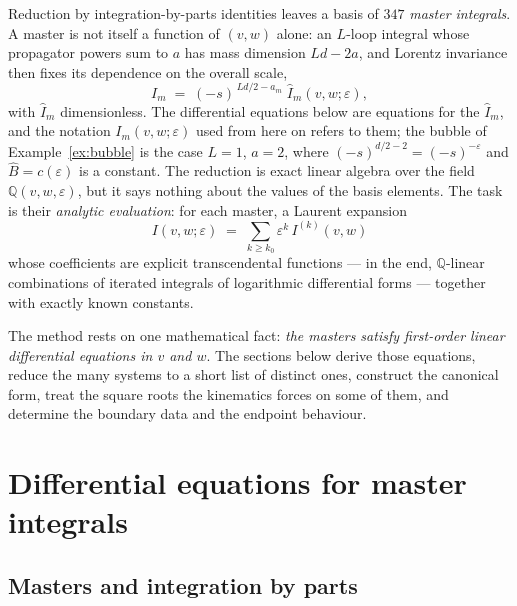 \documentclass[11pt]{article}
\newcommand{\eps}{\varepsilon}
\newcommand{\Q}{\mathbb{Q}}
\begin{document}
Reduction by integration-by-parts identities leaves a basis of $347$
\emph{master integrals}.  A master is not itself a function of
$(v,w)$ alone: an $L$-loop integral whose propagator powers sum to
$a$ has mass dimension $Ld - 2a$, and Lorentz invariance then fixes
its dependence on the overall scale,
\begin{equation}
  I_m \;=\; (-s)^{\,Ld/2 - a_m}\;\hat I_m(v,w;\eps) ,
  \label{eq:dimensionless}
\end{equation}
with $\hat I_m$ dimensionless.  The differential equations below are
equations for the $\hat I_m$, and the notation $I_m(v,w;\eps)$ used
from here on refers to them; the bubble of
Example~\ref{ex:bubble} is the case $L=1$, $a=2$, where
$(-s)^{d/2-2} = (-s)^{-\eps}$ and $\hat B = c(\eps)$ is a constant.
The reduction is exact linear algebra over the field
$\Q(v,w,\eps)$, but it says nothing about the values of the basis
elements.  The task is their \emph{analytic evaluation}: for each
master, a Laurent expansion
\begin{equation}
  I(v,w;\eps) \;=\; \sum_{k \ge k_0} \eps^{k}\, I^{(k)}(v,w)
\end{equation}
whose coefficients are explicit transcendental functions --- in the
end, $\Q$-linear combinations of iterated integrals of logarithmic
differential forms --- together with exactly known constants.

The method rests on one mathematical fact: \emph{the masters satisfy
first-order linear differential equations in $v$ and $w$}.  The
sections below derive those equations, reduce the many systems to a
short list of distinct ones, construct the canonical form, treat the
square roots the kinematics forces on some of them, and determine the
boundary data and the endpoint behaviour.

\section{Differential equations for master integrals}
\label{sec:de}

\subsection{Masters and integration by parts}
\end{document}
